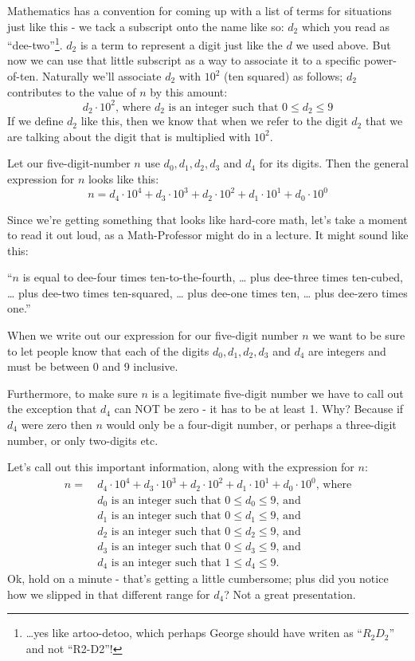 \documentclass{article}
\newenvironment{jprIn}{\begin{adjustwidth}{2em}{}}{\end{adjustwidth}}
\begin{document}
Mathematics has a convention for coming up with
a list of terms for situations just like this -
we tack a subscript onto the name like so: $d_2$ which
you read as ``dee-two''\footnote{\dots{}yes like artoo-detoo, which perhaps
George should have writen as ``$R_2D_2$'' and not ``R2-D2''!}.
$d_2$ is a term to represent a digit just like the $d$ we used above.
But now we can use that little subscript as a way to
associate it to a specific power-of-ten.
Naturally we'll associate $d_2$ with $10^2$ (ten squared) as follows; $d_2$ contributes to
the value of $n$ by this amount:
\[d_2\cdot10^2\text{, where }d_2\text{ is an integer such that }0\le{}d_2\le{}9\]
If we define $d_2$ like this, then we know that when we refer to the digit $d_2$
that we are talking about the digit that is multiplied with $10^2$.

Let our five-digit-number $n$ use $d_0,d_1,d_2,d_3$ and $d_4$ for its digits. Then
the general expression for $n$ looks like this:
\[n=d_4{\cdot}10^4+d_3{\cdot}10^3+d_2{\cdot}10^2+d_1{\cdot}10^1+d_0{\cdot}10^0\]

Since we're getting something that looks like hard-core math, let's take a moment
to read it out loud, as a Math-Professor might do in a lecture.  It might sound like this:
\begin{jprIn}
``$n$ is equal to dee-four times ten-to-the-fourth, \dots{}
plus dee-three times ten-cubed, \dots{} plus dee-two times ten-squared,  \dots{} plus dee-one times ten,  \dots{} plus dee-zero times one.''
\end{jprIn}

When we write out our expression for our five-digit number $n$ we want to be sure
to let people know that each of the digits $d_0,d_1,d_2,d_3$ and $d_4$
are integers and must be between 0 and 9 inclusive.

Furthermore, to make sure $n$ is a legitimate five-digit number we have to
call out the exception that $d_4$ can NOT be zero - it has to be at least 1.
Why? Because if $d_4$ were zero then $n$ would only be a
four-digit number, or perhaps a three-digit number, or only two-digits etc.

Let's call out this important information, along with the expression for $n$:
\begin{align*}
n =\ &d_4{\cdot}10^4+d_3{\cdot}10^3+d_2{\cdot}10^2+d_1{\cdot}10^1+d_0{\cdot}10^0\text{, where}\\
& d_0\text{ is an integer such that }0\le{}d_0\le{}9\text{, and}\\
& d_1\text{ is an integer such that }0\le{}d_1\le{}9\text{, and}\\
& d_2\text{ is an integer such that }0\le{}d_2\le{}9\text{, and}\\
& d_3\text{ is an integer such that }0\le{}d_3\le{}9\text{, and}\\
& d_4\text{ is an integer such that }1\le{}d_4\le{}9.
\end{align*}
Ok, hold on a minute - that's getting a little cumbersome;
plus did  you notice how we slipped in that different range for $d_4$?
Not a great presentation.
\end{document}
